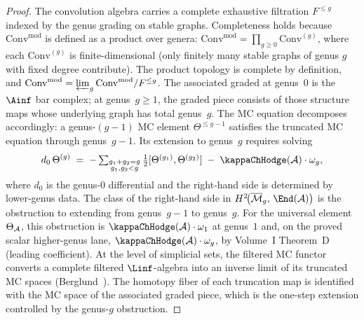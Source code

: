 \begin{proof}
The convolution algebra carries a complete exhaustive filtration
$F^{\leq g}$ indexed by the genus grading on stable graphs.
Completeness holds because $\mathrm{Conv}^{\mathrm{mod}}$ is defined as a product over genera: $\mathrm{Conv}^{\mathrm{mod}} = \prod_{g \geq 0} \mathrm{Conv}^{(g)}$, where each $\mathrm{Conv}^{(g)}$ is finite-dimensional (only finitely many stable graphs of genus $g$ with fixed degree contribute). The product topology is complete by definition, and $\mathrm{Conv}^{\mathrm{mod}} = \varprojlim_g \mathrm{Conv}^{\mathrm{mod}} / F^{\leq g}$.
The
associated graded at genus~$0$ is the $\Ainf$ bar complex; at
genus~$g\ge 1$, the graded piece consists of those structure maps
whose underlying graph has total genus~$g$. The MC equation
decomposes accordingly: a genus-$(g{-}1)$ MC element $\Theta^{\leq g-1}$
satisfies the truncated MC equation through genus~$g-1$. Its
extension to genus~$g$ requires solving
\begin{equation}\label{eq:genus-g-obstruction}
d_0\,\Theta^{(g)}
\;=\;
-\textstyle\sum_{\substack{g_1+g_2=g\\g_1,g_2<g}}
\tfrac{1}{2}[\Theta^{(g_1)},\Theta^{(g_2)}]
\;-\;\kappaChHodge(\cA)\cdot\omega_g,
\end{equation}
where $d_0$ is the genus-$0$ differential and the right-hand
side is determined by lower-genus data. The class of the
right-hand side in
$H^2\!\bigl(\Mbar_g,\,\End(\cA)\bigr)$ is
the obstruction to extending from genus~$g-1$ to genus~$g$.
For the universal element~$\Theta_{\mathcal{A}}$, this obstruction is
$\kappaChHodge(\cA)\cdot\omega_1$ at genus~$1$ and, on the proved scalar
higher-genus lane, $\kappaChHodge(\cA)\cdot\omega_g$, by Volume~I Theorem~D
(leading coefficient).
At the level of simplicial sets, the filtered MC functor
converts a complete filtered $\Linf$-algebra into an inverse
limit of its truncated MC spaces
(Berglund~\cite[Prop.~3.5]{Berglund15}). The homotopy fiber of
each truncation map is identified with the MC space of the
associated graded piece, which is the one-step extension
controlled by the genus-$g$ obstruction.
\end{proof}

